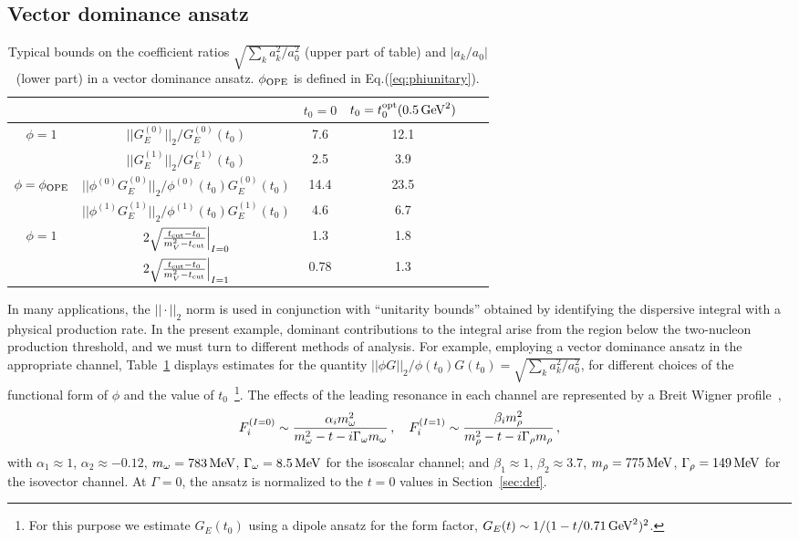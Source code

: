 \documentclass[12pt]{article}
\newcommand{\be}{\begin{equation}}
\newcommand{\ee}{\end{equation}}
\begin{document}
\subsection{Vector dominance ansatz} 

\begin{table}
\begin{center}
\begin{tabular}{cc|cccc}
& & $t_0=0$ & $t_0=t_0^{\rm opt}(0.5\,{\rm GeV}^2)$ 
\\
\hline 
$\phi=1$ 
& $||G^{(0)}_E||_2/G^{(0)}_E(t_0)$ & 7.6 & 12.1  
\\
& $||G^{(1)}_E||_2/G^{(1)}_E(t_0)$ & 2.5 & 3.9 
\\
$\phi=\phi_{\rm OPE}$
& $||\phi^{(0)}G^{(0)}_E||_2/\phi^{(0)}(t_0) G^{(0)}_E(t_0)$ & 14.4 & 23.5 
\\
& $||\phi^{(1)}G^{(1)}_E||_2/\phi^{(1)}(t_0) G^{(1)}_E(t_0)$ & 4.6 & 6.7 
\\\hline
$\phi=1$ 
&
$\left. 2\sqrt{ t_{\rm cut}-t_0 \over m_V^2-t_{\rm cut} } \right|_{I=0}$ 
& 1.3 & 1.8 
\\
&
$\left. 2\sqrt{ t_{\rm cut}-t_0 \over m_V^2-t_{\rm cut} } \right|_{I=1}$ 
& 0.78 & 1.3
\end{tabular} 
\end{center}
\caption{\label{tab:norm}
Typical bounds on the coefficient ratios $ \sqrt{ \sum_k {a_k^2/a_0^2} }$ (upper part of table) 
and $|a_k/a_0|$ (lower part) in a vector dominance ansatz.  $\phi_{\rm OPE}$  
is defined in Eq.(\ref{eq:phiunitary}).
} 
\end{table}

In many applications, the $||\cdot ||_2$ norm is used in conjunction with ``unitarity bounds''
obtained by identifying the dispersive integral with a physical production rate.    
In the present example, dominant contributions to the integral arise from the region below the 
two-nucleon production threshold, and we must turn to different methods of analysis.    
For example, employing a vector dominance ansatz in the appropriate channel, 
Table~\ref{tab:norm} displays estimates for the quantity 
$|| \phi G ||_2/\phi(t_0)G(t_0) = \sqrt{ \sum_k {a_k^2 / a_0^2} }$, 
for different choices of the functional form of $\phi$ and the value of 
$t_0$~\footnote{
For this purpose we estimate $G_E(t_0)$ using a dipole 
ansatz for the form factor, $G_{E}(t) \sim 1/(1-t/0.71\,{\rm GeV}^2)^2$.
}.
The effects of the leading resonance in each channel are represented by a Breit Wigner profile~\cite{Hohler:1974ht}, 
\be
F_i^{(I=0)} \sim {\alpha_i m_\omega^2 \over m_\omega^2 - t - i\Gamma_\omega m_\omega} \,,
\quad
F_i^{(I=1)} \sim {\beta_i m_\rho^2 \over m_\rho^2 - t - i\Gamma_\rho m_\rho} \,, 
\ee
with
$\alpha_1 \approx 1$, $\alpha_2\approx -0.12$, 
$m_\omega=783\,{\rm MeV}$, $\Gamma_\omega = 8.5\,{\rm MeV}$ 
for the isoscalar channel; and
 $\beta_1\approx 1$, $\beta_2\approx 3.7$, 
$m_\rho=775\,{\rm MeV}$, $\Gamma_\rho = 149\,{\rm MeV}$ 
for the isovector channel. At $\Gamma=0$, the ansatz is normalized to 
the $t=0$ values in Section~\ref{sec:def}. 
\end{document}
